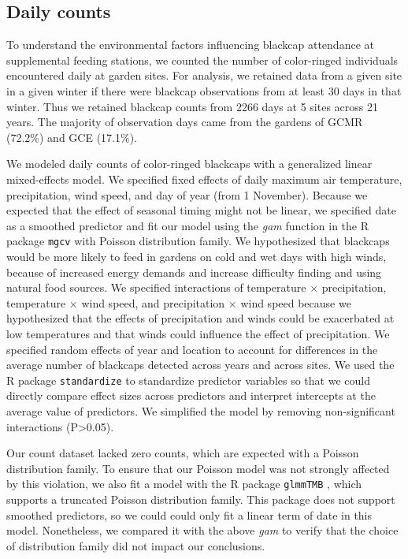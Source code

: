 \documentclass[a4paper, nobind]{templates/ociamthesis}
\begin{document}
\hypertarget{daily-counts}{%
\subsection{Daily counts}\label{daily-counts}}

To understand the environmental factors influencing blackcap attendance at supplemental feeding stations, we counted the number of color-ringed individuals encountered daily at garden sites. For analysis, we retained data from a given site in a given winter if there were blackcap observations from at least 30 days in that winter. Thus we retained blackcap counts from 2266 days at 5 sites across 21 years. The majority of observation days came from the gardens of GCMR (72.2\%) and GCE (17.1\%).

We modeled daily counts of color-ringed blackcaps with a generalized linear mixed-effects model. We specified fixed effects of daily maximum air temperature, precipitation, wind speed, and day of year (from 1 November). Because we expected that the effect of seasonal timing might not be linear, we specified date as a smoothed predictor and fit our model using the \emph{gam} function in the R package \texttt{mgcv} \autocite{woodGeneralizedAdditiveModels2017} with Poisson distribution family. We hypothesized that blackcaps would be more likely to feed in gardens on cold and wet days with high winds, because of increased energy demands and increase difficulty finding and using natural food sources. We specified interactions of temperature \(\times\) precipitation, temperature \(\times\) wind speed, and precipitation \(\times\) wind speed because we hypothesized that the effects of precipitation and winds could be exacerbated at low temperatures and that winds could influence the effect of precipitation. We specified random effects of year and location to account for differences in the average number of blackcaps detected across years and across sites. We used the R package \texttt{standardize} to standardize predictor variables so that we could directly compare effect sizes across predictors and interpret intercepts at the average value of predictors. We simplified the model by removing non-significant interactions (P\textgreater0.05).

Our count dataset lacked zero counts, which are expected with a Poisson distribution family. To ensure that our Poisson model was not strongly affected by this violation, we also fit a model with the R package \texttt{glmmTMB} \autocite{brooksGlmmTMBBalancesSpeed2017}, which supports a truncated Poisson distribution family. This package does not support smoothed predictors, so we could could only fit a linear term of date in this model. Nonetheless, we compared it with the above \emph{gam} to verify that the choice of distribution family did not impact our conclusions.
\end{document}
